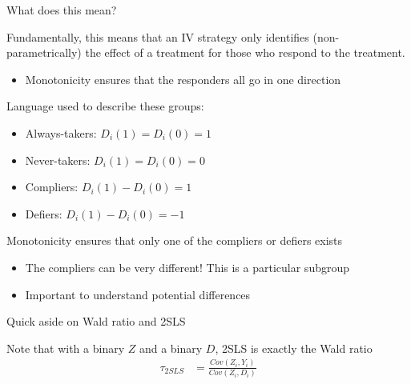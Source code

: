 \documentclass[notes,11pt, aspectratio=169]{beamer}
\newenvironment{wideitemize}{\itemize\addtolength{\itemsep}{10pt}}{\enditemize}
\begin{document}
\begin{frame}{What does this mean?}
  \begin{wideitemize}
  \item Fundamentally, this means that an IV strategy only identifies
    (non-parametrically) the effect of a treatment for those who
    respond to the treatment.
    \begin{itemize}
    \item     Monotonicity ensures that the responders all go in one direction
    \end{itemize}
  \item Language used to describe these groups:
    \begin{itemize}
    \item Always-takers: $D_{i}(1) = D_{i}(0) = 1$
    \item Never-takers: $D_{i}(1) = D_{i}(0) = 0$
    \item Compliers: $D_{i}(1) - D_{i}(0) = 1$
    \item Defiers: $D_{i}(1) - D_{i}(0) = -1$                   
    \end{itemize}
  \item Monotonicity ensures that only one of the compliers or defiers exists
    \begin{itemize}
    \item The compliers can be very different! This is a particular subgroup
    \item Important to understand potential differences
    \end{itemize}
  \end{wideitemize}
\end{frame}

\begin{frame}{Quick aside on Wald ratio and 2SLS}
  \begin{wideitemize}
  \item Note that with a binary $Z$ and a binary $D$, 2SLS is exactly the Wald ratio
    \begin{align*}
      \tau_{2SLS} &= \frac{Cov(Z_{i}, Y_{i})}{Cov(Z_{i}, D_{i})}\\
    \end{align*}
  \end{wideitemize}
  
\end{frame}
\end{document}
